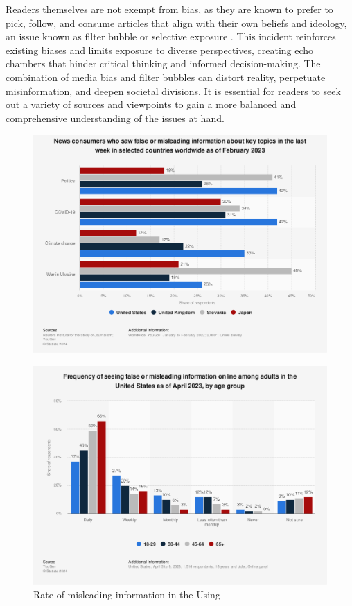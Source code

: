 Readers themselves are not exempt from bias, as they are known to prefer to pick, follow, and consume articles that align with their own beliefs and ideology, an issue known as filter bubble \cite{lim-2018-understanding} or selective exposure \cite{spinde-2024-taxonomy}. This incident reinforces existing biases and limits exposure to diverse perspectives, creating echo chambers that hinder critical thinking and informed decision-making. The combination of media bias and filter bubbles can distort reality, perpetuate misinformation, and deepen societal divisions. It is essential for readers to seek out a variety of sources and viewpoints to gain a more balanced and comprehensive understanding of the issues at hand.


\begin{figure}[htbp]
    \centering
    \includegraphics[width=0.9\linewidth]{images/statistic_id1317019_consumers-witnessing-false-information-on-certain-topics-worldwide-2023.png}
    \caption{\cite{reuters-2023-false-info}}
    \label{fig:consumers-witnessing-false-information-on-certain-topics-worldwide-2023}
\end{figure}


\begin{figure}[htbp]
    \centering
    \includegraphics[width=0.9\linewidth]{images/statistic_id1462057_frequency-of-seeing-false-information-online-in-the-us-2023-by-age-group.png}
    \caption{Rate of misleading information in the Using\cite{yougov-2023-frequency}}
    \label{fig:frequency-of-seeing-false-information-online-in-the-us-2023-by-age-group}
\end{figure}

